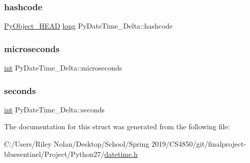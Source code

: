 \mbox{\label{struct_py_date_time___delta_a23740dde2f75d5e32b20aefdabd13374}} 
\subsubsection{\texorpdfstring{hashcode}{hashcode}}
{\footnotesize\ttfamily \mbox{\hyperlink{_python27_2object_8h_a0bf35c1f3ea13f925de94d8593db3b7e}{Py\+Object\+\_\+\+H\+E\+AD}} \mbox{\hyperlink{modsupport_8h_a0cb68e00fb9fb1260ee2daadd9fe6611}{long}} Py\+Date\+Time\+\_\+\+Delta\+::hashcode}

\mbox{\label{struct_py_date_time___delta_a0c712ea03616f403e388033d768ebcab}} 
\subsubsection{\texorpdfstring{microseconds}{microseconds}}
{\footnotesize\ttfamily \mbox{\hyperlink{warnings_8h_a74f207b5aa4ba51c3a2ad59b219a423b}{int}} Py\+Date\+Time\+\_\+\+Delta\+::microseconds}

\mbox{\label{struct_py_date_time___delta_a31d1e1c9eeccdb867ec43536a4b6c721}} 
\subsubsection{\texorpdfstring{seconds}{seconds}}
{\footnotesize\ttfamily \mbox{\hyperlink{warnings_8h_a74f207b5aa4ba51c3a2ad59b219a423b}{int}} Py\+Date\+Time\+\_\+\+Delta\+::seconds}



The documentation for this struct was generated from the following file\+:\begin{DoxyCompactItemize}
\item 
C\+:/\+Users/\+Riley Nolan/\+Desktop/\+School/\+Spring 2019/\+C\+S4850/git/finalproject-\/bluesentinel/\+Project/\+Python27/\mbox{\hyperlink{datetime_8h}{datetime.\+h}}\end{DoxyCompactItemize}
